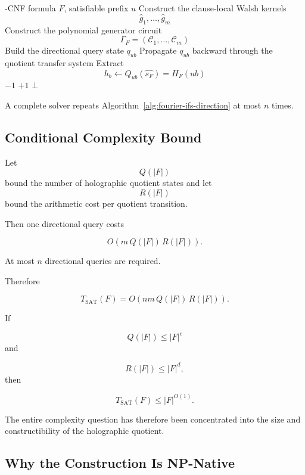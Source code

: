 \documentclass[11pt]{article}
\theoremstyle{plain}
\theoremstyle{definition}
\begin{document}
\begin{algorithm}
\caption{Fourier--IFS Holographic SAT Direction}
\label{alg:fourier-ifs-direction}
\begin{algorithmic}[1]
-CNF formula \(F\), satisfiable prefix \(u\)
\State Construct the clause-local Walsh kernels
\[
    \widehat g_1,\dots,\widehat g_m
\]
\State Construct the polynomial generator circuit
\[
    \Gamma_F=(\mathcal C_1,\dots,\mathcal C_m)
\]
    \State Build the directional query state \(q_{ub}\)
    \State Propagate \(q_{ub}\) backward through the quotient transfer system
    \State Extract
    \[
        h_b
        \gets
        Q_{ub}(\widehat{s_F})
        =
        H_F(ub)
    \]
\EndFor
{}
    \State \Return \(-1\)
    \State \Return \(+1\)
\Else
    \State \Return \(\bot\)
\EndIf
\end{algorithmic}
\end{algorithm}

A complete solver repeats Algorithm~\ref{alg:fourier-ifs-direction} at most
\(n\) times.

\subsection{Conditional Complexity Bound}

Let
\[
    Q(|F|)
\]
bound the number of holographic quotient states and let
\[
    R(|F|)
\]
bound the arithmetic cost per quotient transition.

Then one directional query costs

\[
    O\!\left(
        m\,Q(|F|)\,R(|F|)
    \right).
\]

At most \(n\) directional queries are required.

Therefore

\[
\boxed{
T_{\mathrm{SAT}}(F)
=
O\!\left(
    nm\,Q(|F|)\,R(|F|)
\right).
}
\]

If

\[
    Q(|F|)\leq |F|^{c}
\]
and

\[
    R(|F|)\leq |F|^{d},
\]
then

\[
    T_{\mathrm{SAT}}(F)
    \leq
    |F|^{O(1)}.
\]

The entire complexity question has therefore been concentrated into the size
and constructibility of the holographic quotient.

\subsection{Why the Construction Is NP-Native}
\end{document}

